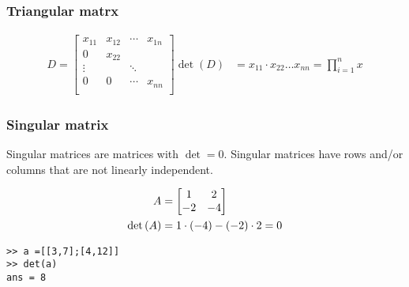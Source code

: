 \subsubsection{Triangular matrx}
\begin{align*}
    D = \begin{bmatrix}
        x_{11} & x_{12} & \cdots & x_{1n} \\
        0      & x_{22} &        &        \\
        \vdots &        & \ddots          \\
        0      & 0      & \cdots & x_{nn} \\
    \end{bmatrix} \det(D) & = x_{11} \cdot x_{22} \dots x_{nn} = \prod_{i=1}^n x_{}
\end{align*}
\subsubsection{Singular matrix}
Singular matrices are matrices with \( \det = 0 \).
Singular matrices have rows and/or columns that are not linearly independent.
\begin{example}
    \begin{align*}
        A               & = \begin{bmatrix}
            1 & 2 \\ -2 & -4
        \end{bmatrix}      \\
        \det \left( A \right) & = 1 \cdot (-4) - (-2) \cdot 2 = 0
    \end{align*}
\end{example}
\begin{matlab}
    \begin{lstlisting}
>> a =[[3,7];[4,12]]
>> det(a)
ans = 8
\end{lstlisting}
\end{matlab}
